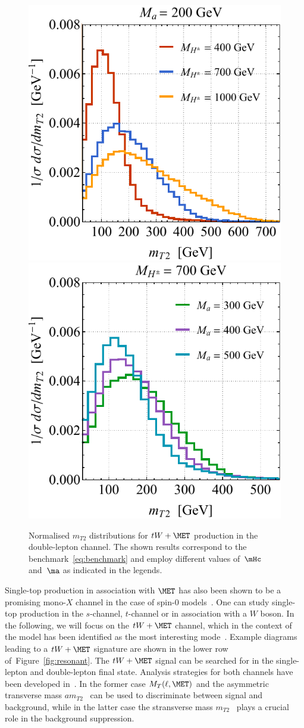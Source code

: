 \begin{figure}[t!]
\centering
\includegraphics[height=0.45\textwidth]{texinputs/04_grid/newfigures/mt2l.pdf} \qquad 
\includegraphics[height=0.45\textwidth]{texinputs/04_grid/newfigures/mt2r.pdf}
\vspace{2mm}
\caption{\label{fig:mt2spectra} Normalised $m_{T2}$ distributions for $tW+\MET$ production in the double-lepton channel.  The shown results correspond to the \hdma benchmark~\eqref{eq:benchmark} and employ different values of~$\mHc$ and~$\ma$ as indicated in the legends.}
\end{figure}

Single-top production in association with $\MET$ has also been shown to be a promising mono-$X$ channel in the case of spin-0 models~\cite{Pinna:2017tay,Pani:2017qyd,Plehn:2017bys}. One can study single-top production in the $s$-channel, $t$-channel  or  in association with a $W$ boson. In the following, we will focus on the $tW + \MET$ channel, which in the context of the \hdma model has been identified as the most interesting mode~\cite{Pani:2017qyd}. Example diagrams leading to a $tW + \MET$ signature are shown in the lower row of~Figure~\ref{fig:resonant}. The $tW + \MET$ signal can be searched for in the single-lepton and double-lepton final state. Analysis strategies for both channels have been developed in~\cite{Pani:2017qyd}. In the former case $M_T (\ell, \MET)$ and the asymmetric transverse mass $am_{T2}$~\cite{Konar:2009qr,Lester:2014yga} can be used to discriminate between signal and background, while in the latter case the stransverse mass $m_{T2}$~\cite{Lester:1999tx,Barr:2003rg} plays a crucial role in the background suppression.

